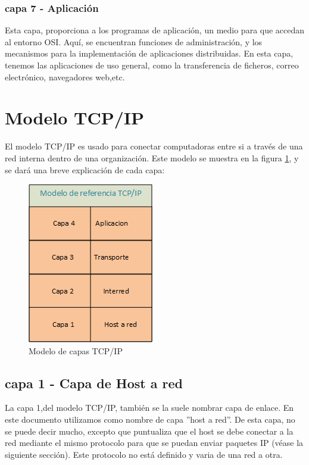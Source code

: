 \subsubsection{capa 7 - Aplicación} 
Esta capa, proporciona a los programas de aplicación, un medio para que accedan al entorno OSI. Aquí, se encuentran funciones de administración, y los mecanismos para la implementación de aplicaciones distribuidas. En esta capa, tenemos las aplicaciones de uso general, como la transferencia de ficheros, correo electrónico, navegadores web,etc. 


\section{Modelo TCP/IP} 
  El modelo TCP/IP es usado para conectar computadoras entre si a través de una red interna dentro de una organización. Este modelo se muestra en la figura \ref{fig:model_tcpip}, y se dará una breve explicación de cada capa: 
  \begin{figure}[ht]
  	\centering
  	\includegraphics{model_tcpip}
  	\caption{Modelo de capas TCP/IP}
  	\label{fig:model_tcpip}
  \end{figure} 

\subsection{capa 1 - Capa de Host a red}
La capa 1,del modelo TCP/IP, también se la suele nombrar capa de enlace. En este documento utilizamos como nombre de capa ''host a red''. De esta capa, no se puede decir mucho, excepto que puntualiza que el host se debe conectar a la red mediante el mismo protocolo para que se puedan enviar paquetes IP (véase la siguiente sección). Este protocolo no está definido y varia de una red a otra.
